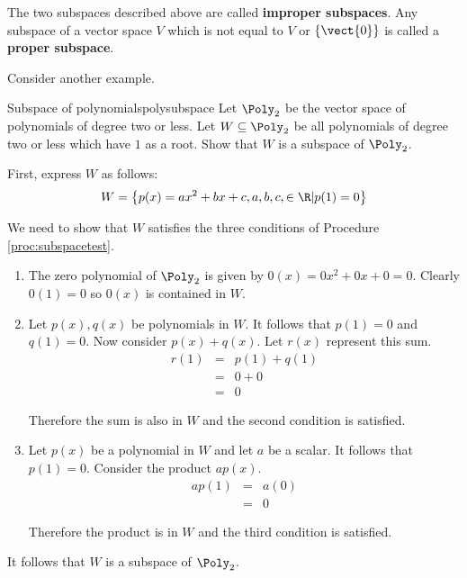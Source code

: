 The two subspaces described above are called \textbf{improper subspaces}. Any subspace of a vector space $V$ which is not equal to $V$ or  $\left\{ \vect{0} \right\}$ is called a \textbf{proper subspace}. 

Consider another example.

\begin{example}{Subspace of polynomials}{polysubspace}
Let $\Poly_2$ be the vector space of polynomials of degree two or less. Let $W \subseteq \Poly_2$ be all polynomials of degree two or less which have $1$ as a root. Show that $W$ is a subspace of $\Poly_2$. 
\end{example}

\begin{solution}
First, express $W$ as follows:
\[
W = \left\{ p(x) = ax^2 +bx +c, a,b,c, \in \R | p(1)  = 0 \right\}
\]

We need to show that $W$ satisfies the three conditions of Procedure \ref{proc:subspacetest}. 
\begin{enumerate}
\item
The zero polynomial of $\Poly_2$ is given by $0(x) = 0x^2 + 0x + 0 = 0$. Clearly $0(1) = 0$ so $0(x)$ is contained in $W$. 

\item
Let $p(x), q(x)$ be polynomials in $W$.  It follows that $p(1) = 0 $ and $q(1) = 0$. Now consider $p(x) + q(x)$. Let $r(x)$ represent this sum.
\begin{eqnarray*}
r(1) &=& p(1) + q(1) \\
&=& 0 + 0 \\
&=& 0
\end{eqnarray*}

Therefore the sum is also in $W$ and the second condition is satisfied. 

\item
Let $p(x)$ be a polynomial in $W$ and let $a$ be a scalar. It follows that $p(1) = 0$. Consider the product $ap(x)$. 
\begin{eqnarray*}
ap(1) &=& a(0) \\
&=& 0
\end{eqnarray*}

Therefore the product is in $W$ and the third condition is satisfied.
\end{enumerate}

It follows that $W$ is a subspace of $\Poly_2$. 
\end{solution} 

